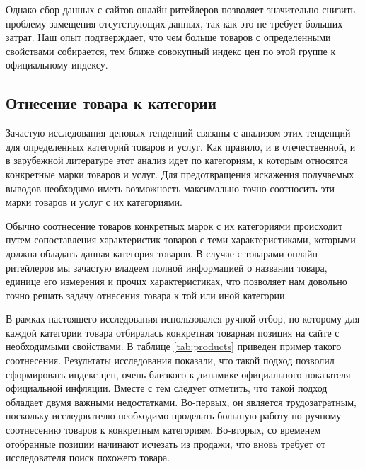 Однако сбор данных с сайтов онлайн-ритейлеров позволяет значительно снизить проблему замещения отсутствующих данных, так как это не требует больших затрат. Наш опыт подтверждает, что чем больше товаров с определенными свойствами собирается, тем ближе совокупный индекс цен по этой группе к официальному индексу.

\subsection{Отнесение товара к категории}\label{subsec:ch2/sec2/sub3}

Зачастую исследования ценовых тенденций связаны с анализом этих тенденций для определенных категорий товаров и услуг. Как правило, и в отечественной, и в зарубежной литературе этот анализ идет по категориям, к которым относятся конкретные марки товаров и услуг. Для предотвращения искажения получаемых выводов необходимо иметь возможность максимально точно соотносить эти марки товаров и услуг с их категориями.

Обычно соотнесение товаров конкретных марок с их категориями происходит путем сопоставления характеристик товаров с теми характеристиками, которыми должна обладать данная категория товаров. В случае с товарами онлайн-ритейлеров мы зачастую владеем полной информацией о названии товара, единице его измерения и прочих характеристиках, что позволяет нам довольно точно решать задачу отнесения товара к той или иной категории.

В рамках настоящего исследования использовался ручной отбор, по которому для каждой категории товара отбиралась конкретная товарная позиция на сайте с необходимыми свойствами. В таблице \cref{tab:products} приведен пример такого соотнесения. Результаты исследования \cite{cavallo2016billion} показали, что такой подход позволил сформировать индекс цен, очень близкого к динамике официального показателя официальной инфляции. Вместе с тем следует отметить, что такой подход обладает двумя важными недостатками. Во-первых, он является трудозатратным, поскольку исследователю необходимо проделать большую работу по ручному соотнесению товаров к конкретным категориям. Во-вторых, со временем отобранные позиции начинают исчезать из продажи, что вновь требует от исследователя поиск похожего товара. 


